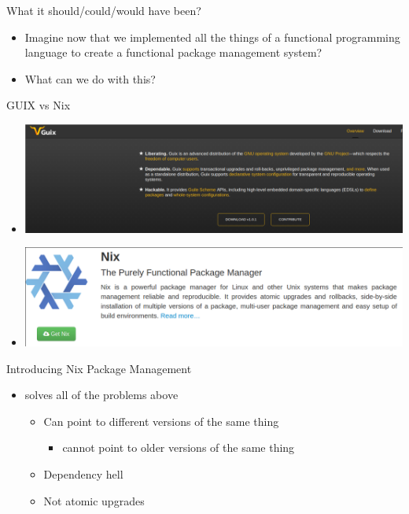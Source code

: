 \documentclass[presentation]{beamer}
\begin{document}
\begin{frame}[label={sec:org72632d2},fragile]{What it should/could/would have been?}
 \begin{itemize}
\item Imagine now that we implemented all the things of a functional programming
language to create a functional package management system?
\item What can we do with this?
\end{itemize}
\begin{block}{GUIX vs Nix}
\begin{itemize}
\item \begin{center}
\includegraphics[width=.9\linewidth]{./images/screenshot-04.png}
\end{center}
\item \begin{center}
\includegraphics[width=.9\linewidth]{./images/screenshot-03.png}
\end{center}
\end{itemize}
\end{block}
\begin{block}{Introducing Nix Package Management}
\begin{itemize}
\item solves all of the problems above
\begin{itemize}
\item Can point to different versions of the same thing
\begin{itemize}
\item cannot point to older versions of the same thing
\end{itemize}
\item Dependency hell
\item Not atomic upgrades
\begin{itemize}

\end{itemize}
\end{itemize}
\end{itemize}
\end{block}
\end{frame}
\end{document}
